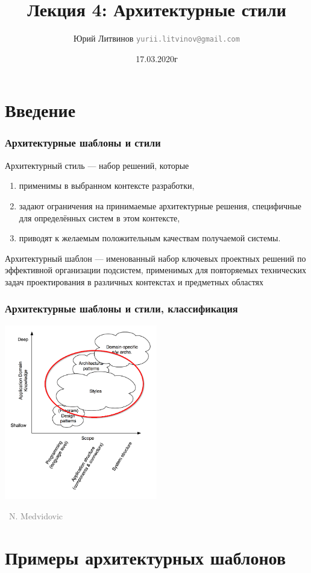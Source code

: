 \documentclass[xetex,mathserif,serif]{beamer}
\title{Лекция 4: Архитектурные стили}
\author[Юрий Литвинов]{Юрий Литвинов \newline \textcolor{gray}{\small\texttt{yurii.litvinov@gmail.com}}}
\date{17.03.2020г}
\newcommand{\attribution}[1] {
	\vspace{-5mm}\begin{flushright}\begin{scriptsize}\textcolor{gray}{\textcopyright\, #1}\end{scriptsize}\end{flushright}
}
\begin{document}
	
	\frame{\titlepage}

	\section{Введение}

	\begin{frame}
		\frametitle{Архитектурные шаблоны и стили}
		Архитектурный стиль --- набор решений, которые
		\begin{enumerate}
			\item применимы в выбранном контексте разработки,
			\item задают ограничения на принимаемые архитектурные решения, специфичные для определённых систем в этом контексте,
			\item приводят к желаемым положительным качествам получаемой системы.
		\end{enumerate}
		Архитектурный шаблон --- именованный набор ключевых проектных решений по эффективной организации подсистем, применимых для повторяемых технических задач проектирования в различных контекстах и предметных областях
	\end{frame}

	\begin{frame}
		\frametitle{Архитектурные шаблоны и стили, классификация}
		\begin{center}
			\includegraphics[width=0.5\textwidth]{architecturalStylesHighlighted.png}
			\attribution{N. Medvidovic}
		\end{center}
	\end{frame}

	\section{Примеры архитектурных шаблонов}
\end{document}
